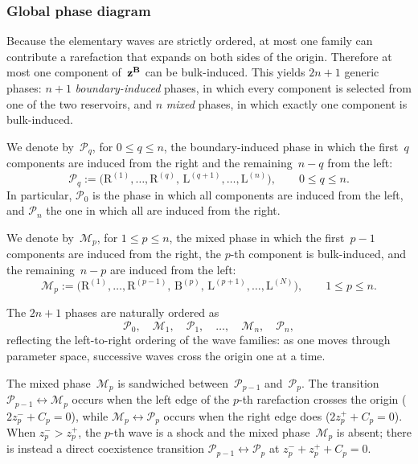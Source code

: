 \documentclass[12pt]{article}
\begin{document}
\subsubsection*{Global phase diagram}

Because the elementary waves are strictly ordered, at most one family can
contribute a rarefaction that expands on both sides of the origin. Therefore at most one
component of~${\bf z^B}$ can be bulk-induced. This yields $2n+1$ generic phases:
$n+1$ {\it boundary-induced} phases, in which every component is selected
from one of the two reservoirs, and $n$ {\it mixed} phases, in which
exactly one component is bulk-induced.

We denote by~$\mathcal{P}_q$, for $0\le q\le n$, the boundary-induced
phase in which the first~$q$ components are induced from the right and the
remaining~$n-q$ from the left:
\[
\mathcal{P}_q
:=
\bigl(\mathrm{R}^{(1)},\dots,\mathrm{R}^{(q)},\,
      \mathrm{L}^{(q+1)},\dots,\mathrm{L}^{(n)}\bigr),
\qquad 0\le q\le n.
\]
In particular, $\mathcal{P}_0$ is the phase in which all components are
induced from the left, and $\mathcal{P}_n$ the one in which all are
induced from the right.

We denote by~$\mathcal{M}_p$, for $1\le p\le n$, the mixed phase in which
the first~$p-1$ components are induced from the right, the $p$-th
component is bulk-induced, and the remaining~$n-p$ are induced from the
left:
\[
\mathcal{M}_p
:=
\bigl(\mathrm{R}^{(1)},\dots,\mathrm{R}^{(p-1)},\,
      \mathrm{B}^{(p)},\,
      \mathrm{L}^{(p+1)},\dots,\mathrm{L}^{(N)}\bigr),
\qquad 1\le p\le n.
\]

The $2n+1$ phases are naturally ordered as
\[
\mathcal{P}_0,\quad
\mathcal{M}_1,\quad
\mathcal{P}_1,\quad
\dots,\quad
\mathcal{M}_n,\quad
\mathcal{P}_n,
\]
reflecting the left-to-right ordering of the wave families: as one moves
through parameter space, successive waves cross the origin one at a time.

The mixed phase~$\mathcal{M}_p$ is sandwiched between~$\mathcal{P}_{p-1}$
and~$\mathcal{P}_p$. The transition
$\mathcal{P}_{p-1}\leftrightarrow\mathcal{M}_p$ occurs when the left edge
of the $p$-th rarefaction crosses the origin ($2z_p^-+C_p=0$), while
$\mathcal{M}_p\leftrightarrow\mathcal{P}_p$ occurs when the right edge
does ($2z_p^++C_p=0$). When $z_p^->z_p^+$, the $p$-th wave is a shock and
the mixed phase~$\mathcal{M}_p$ is absent; there is instead a direct
coexistence transition $\mathcal{P}_{p-1}\leftrightarrow\mathcal{P}_p$ at
$z_p^-+z_p^++C_p=0$.
\end{document}
